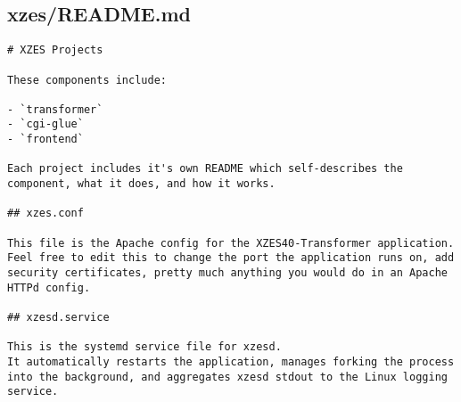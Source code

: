 \subsection{xzes/README.md}
\begin{lstlisting}
# XZES Projects

These components include:

- `transformer`
- `cgi-glue`
- `frontend`

Each project includes it's own README which self-describes the component, what it does, and how it works.

## xzes.conf

This file is the Apache config for the XZES40-Transformer application.
Feel free to edit this to change the port the application runs on, add security certificates, pretty much anything you would do in an Apache HTTPd config.

## xzesd.service

This is the systemd service file for xzesd.
It automatically restarts the application, manages forking the process into the background, and aggregates xzesd stdout to the Linux logging service.
\end{lstlisting}
